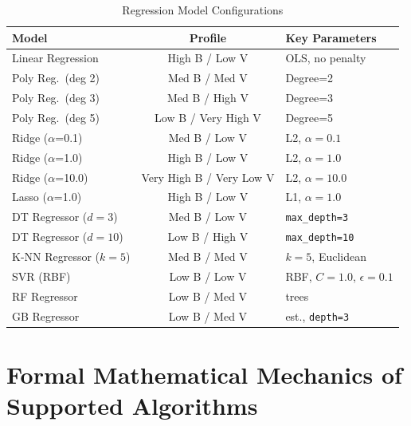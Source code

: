 \documentclass[conference]{IEEEtran}
\begin{document}
\begin{table}[t]
    \caption{Regression Model Configurations}
    \label{tab:regressors}
    \centering
    \small
    \renewcommand{\arraystretch}{1.3}
    \begin{tabular}{|>{\raggedright\arraybackslash}p{1.3in}|c|>{\raggedright\arraybackslash}p{1.1in}|}
    \hline
    \textbf{Model} & \textbf{Profile} & \textbf{Key Parameters} \\
    \hline
    Linear Regression       & High B / Low V   & OLS, no penalty \\
    \hline
    Poly Reg.\ (deg 2)      & Med B / Med V    & Degree=2 \\
    \hline
    Poly Reg.\ (deg 3)      & Med B / High V   & Degree=3 \\
    \hline
    Poly Reg.\ (deg 5)      & Low B / Very High V & Degree=5 \\
    \hline
    Ridge ($\alpha$=0.1)    & Med B / Low V    & L2, $\alpha=0.1$ \\
    \hline
    Ridge ($\alpha$=1.0)    & High B / Low V   & L2, $\alpha=1.0$ \\
    \hline
    Ridge ($\alpha$=10.0)   & Very High B / Very Low V & L2, $\alpha=10.0$ \\
    \hline
    Lasso ($\alpha$=1.0)    & High B / Low V   & L1, $\alpha=1.0$ \\
    \hline
    DT Regressor ($d=3$)    & Med B / Low V    & \texttt{max\_depth=3} \\
    \hline
    DT Regressor ($d=10$)   & Low B / High V   & \texttt{max\_depth=10} \\
    \hline
    K-NN Regressor ($k=5$)  & Med B / Med V    & $k=5$, Euclidean \\
    \hline
    SVR (RBF)               & Low B / Low V    & RBF, $C=1.0$, $\epsilon=0.1$ \\
    \hline
    RF Regressor            & Low B / Med V    & 100 trees \\
    \hline
    GB Regressor            & Low B / Med V    & 100 est., \texttt{depth=3} \\
    \hline
    \end{tabular}
\end{table}

\section{Formal Mathematical Mechanics of Supported Algorithms}
\end{document}
